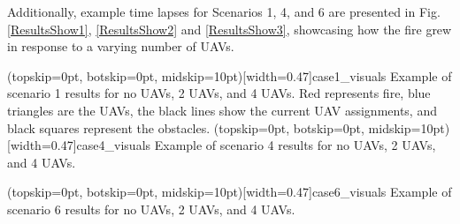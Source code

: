 \documentclass{ieeeaccess}
\begin{document}

Additionally, example time lapses for Scenarios 1, 4, and 6 are presented in Fig. \ref{ResultsShow1}, \ref{ResultsShow2} and \ref{ResultsShow3}, showcasing how the fire grew in response to a varying number of UAVs.


\Figure[t!](topskip=0pt, botskip=0pt, midskip=10pt)[width=0.47\textwidth]{case1_visuals}
{Example of scenario 1 results for no UAVs, 2 UAVs, and 4 UAVs. Red represents fire, blue triangles are the UAVs, the black lines show the current UAV assignments, and black squares represent the obstacles.\label{ResultsShow1}}
\Figure[t!](topskip=0pt, botskip=0pt, midskip=10pt)[width=0.47\textwidth]{case4_visuals}
{Example of scenario 4 results for no UAVs, 2 UAVs, and 4 UAVs.\label{ResultsShow2}}

\Figure[t!](topskip=0pt, botskip=0pt, midskip=10pt)[width=0.47\textwidth]{case6_visuals}
{Example of scenario 6 results for no UAVs, 2 UAVs, and 4 UAVs.\label{ResultsShow3}}
\end{document}
